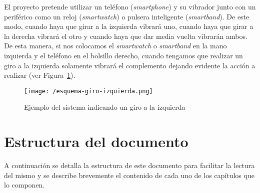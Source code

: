 El proyecto pretende utilizar un teléfono (\emph{smartphone}) y su vibrador junto con un periférico
como un reloj (\emph{smartwatch}) o pulsera inteligente (\emph{smartband}). De este modo, cuando
haya que girar a la izquierda vibrará uno, cuando haya que girar a la derecha vibrará el otro y
cuando haya que dar media vuelta vibrarán ambos. De esta manera, si nos colocamos el
\emph{smartwatch} o \emph{smartband} en la mano izquierda y el teléfono en el bolsillo derecho,
cuando tengamos que realizar un giro a la izquierda solamente vibrará el complemento dejando
evidente la acción a realizar (ver Figura~\ref{fig:giroIzquierda}).

\begin{figure}[!h]
  \begin{center}
    \texttt{[image: /esquema-giro-izquierda.png]}
    \caption{Ejemplo del sistema indicando un giro a la izquierda}
    \label{fig:giroIzquierda}
  \end{center}
\end{figure}


\section{Estructura del documento}

A continuación se detalla la estructura de este documento para facilitar la lectura del mismo y
se describe brevemente el contenido de cada uno de los capítulos que lo componen.

